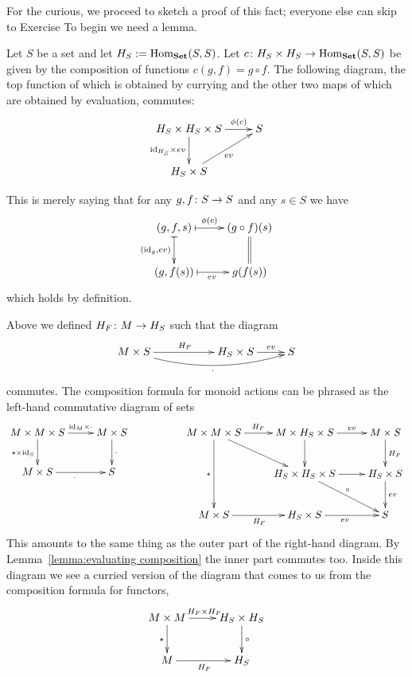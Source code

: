 \documentclass[CT4S-EN-RU]{subfiles}
\begin{document}
\begin{blockENG}
For the curious, we proceed to sketch a proof of this fact; everyone else can skip to Exercise %
To begin we need a lemma.
\end{blockENG}

\begin{blockRUS}
\end{blockRUS}

\begin{lemmaENG}\label{lemma:evaluating composition}
Let $S$ be a set and let $H_S:=\textnormal{Hom}_{\mathbf{Set}}(S,S)$. Let $c\colon H_S\times H_S\rightarrow\textnormal{Hom}_{\mathbf{Set}}(S,S)$ be given by the composition of functions $c(g,f)=g\circ f$. The following diagram, the top function of which is obtained by currying and the other two maps of which are obtained by evaluation, commutes: 
$$
\xymatrix{H_S\times H_S\times S\ar[r]^-{\phi(c)}\ar[d]_{\id_{H_S}\times ev}&S\\H_S\times S\ar[ur]_{ev}}
$$
\end{lemmaENG}

\begin{lemmaRUS}\label{lemma:evaluating composition}
\end{lemmaRUS}

\begin{proofENG}
This is merely saying that for any $g,f\colon S\rightarrow S$ and any $s\in S$ we have 
$$
\xymatrix{(g,f,s)\ar@{|->}[r]^-{\phi(c)}\ar@{|->}[d]_{(\id_g,ev)}&(g\circ f)(s)\ar@{=}[d]\\(g,f(s))\ar@{|->}[r]_{ev}&g(f(s))}
$$
which holds by definition.
\end{proofENG}

\begin{proofRUS}
\end{proofRUS}

\begin{blockENG}
Above we defined $H_F\colon M\rightarrow H_S$ such that the diagram 
$$
\xymatrix{M\times S\ar[rr]^{H_F}\ar@/_1pc/[rrr]_{\cdot}&&H_S\times S\ar[r]^-{ev}&S}
$$
commutes. The composition formula for monoid actions can be phrased as the left-hand commutative diagram of sets
$$
\xymatrix{M\times M\times S\ar[r]^-{\id_M\times\cdot}\ar[d]_{\star\times\id_S}&M\times S\ar[d]^\cdot\\M\times S\ar[r]_\cdot&S}
\hspace{.7in}
\xymatrix@=25pt{
M\times M\times S\ar[rd]\ar[r]^-{H_F}\ar[dd]_{\star}&M\times H_S\times S\ar[d]\ar[r]^-{ev}&M\times S\ar[d]^{H_F}\\
&H_S\times H_S\times S\ar[r]\ar[rd]^\circ&H_S\times S\ar[d]^{ev}\\
M\times S\ar[r]_{H_F}&H_S\times S\ar[r]_{ev}&S}
$$
This amounts to the same thing as the outer part of the right-hand diagram. By Lemma~\ref{lemma:evaluating composition} the inner part commutes too. Inside this diagram we see a curried version of the diagram that comes to us from the composition formula for functors,
$$
\xymatrix{M\times M\ar[r]^{H_F\times H_F}\ar[d]_\star&H_S\times H_S\ar[d]^\circ\\M\ar[r]_{H_F}&H_S}
$$
\end{blockENG}
\end{document}
